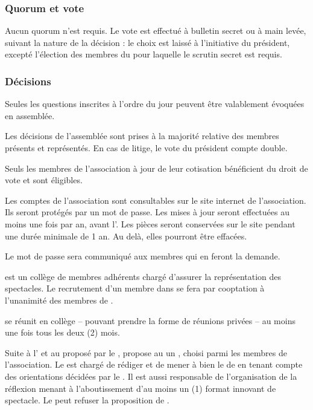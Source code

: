 \subsubsection*{Quorum et vote}

Aucun quorum n'est requis. Le vote est effectué à bulletin secret ou à
main levée, suivant la nature de la décision : le choix est laissé à
l'initiative du président, excepté l'élection des membres du \bureau{}
pour laquelle le scrutin secret est requis.


\subsubsection*{Décisions}

Seules les questions inscrites à l'ordre du jour peuvent être
valablement évoquées en assemblée.

Les décisions de l'assemblée sont prises à la majorité relative des
membres présents et représentés. En cas de litige, le vote du
président compte double.

Seuls les membres de l'association à jour de leur cotisation
bénéficient du droit de vote et sont éligibles.

\label{sec:transp-des-compt}
Les comptes de l'association sont consultables sur le site internet de l'association. Ils seront protégés par un mot de passe. Les mises à jour seront effectuées au moins une fois par an, avant l'\AGO{}. Les pièces seront conservées sur le site pendant une durée minimale de 1 an. Au delà, elles pourront être effacées.

Le mot de passe sera communiqué aux membres qui en feront la demande.

\label{sec:fonctionnement-troupe}
\troupe{} est un collège de membres adhérents chargé d'assurer la représentation des spectacles. Le recrutement d'un membre dans \troupe{} se fera par cooptation à l'unanimité des membres de \troupe{}.

 \troupe{} se réunit en collège -- pouvant prendre la forme de réunions privées -- au moins une fois tous les deux (2) mois.

Suite à l'\AGO{} et au \PA{} proposé par le \bureau{}, \troupe{} propose au \bureau{} un \DA{}, choisi parmi les membres de l'association. Le \DA{} est chargé de rédiger et de mener à bien le \PA{} de \troupe{} en tenant compte des orientations décidées par le \bureau{}. Il est aussi responsable de l'organisation de la réflexion menant à l'aboutissement d'au moins un (1) format innovant de spectacle. Le \bureau{} peut refuser la proposition de \troupe{}. 

